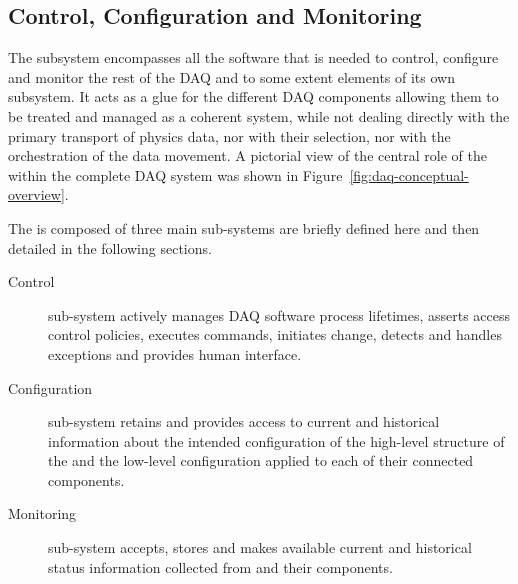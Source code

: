 


\subsection{Control, Configuration and Monitoring}
\label{sec:fd-daq:design-run-control}


The  subsystem encompasses all the software that is needed to control, configure and monitor the rest of the DAQ and to some extent elements of its own subsystem. 
It acts as a glue for the different DAQ components allowing them to be treated and managed as a coherent system, while not dealing directly with the primary transport of physics data, nor with their selection, nor with the orchestration of the data movement. 
A pictorial view of the central role of the  within the complete DAQ system was shown in Figure~\ref{fig:daq-conceptual-overview}.

The  is composed of three main sub-systems are briefly defined here and then detailed in the following sections.
\begin{description}

\item[Control] sub-system actively manages DAQ software process lifetimes, asserts access control policies, executes commands, initiates change, detects and handles exceptions and provides human interface.


\item[Configuration] sub-system retains and provides access to current and historical information about the intended configuration of the high-level structure of the  and the low-level configuration applied to each of their connected components.

\item[Monitoring] sub-system accepts, stores and makes available current and historical status information collected from  and their components.

\end{description}

